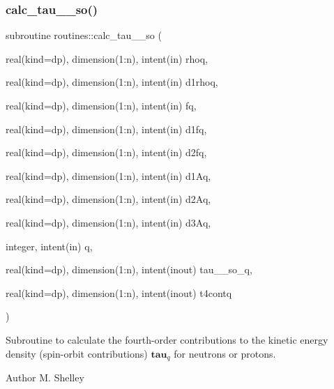 \subsubsection{\texorpdfstring{calc\+\_\+tau\+\_\+\_\+so()}{calc\_tau\_4\_so()}}
{\footnotesize\ttfamily subroutine routines\+::calc\+\_\+tau\+\_\+\_\+so (\begin{DoxyParamCaption}\item[{real(kind=dp), dimension(1\+:n), intent(in)}]{rhoq,  }\item[{real(kind=dp), dimension(1\+:n), intent(in)}]{d1rhoq,  }\item[{real(kind=dp), dimension(1\+:n), intent(in)}]{fq,  }\item[{real(kind=dp), dimension(1\+:n), intent(in)}]{d1fq,  }\item[{real(kind=dp), dimension(1\+:n), intent(in)}]{d2fq,  }\item[{real(kind=dp), dimension(1\+:n), intent(in)}]{d1\+Aq,  }\item[{real(kind=dp), dimension(1\+:n), intent(in)}]{d2\+Aq,  }\item[{real(kind=dp), dimension(1\+:n), intent(in)}]{d3\+Aq,  }\item[{integer, intent(in)}]{q,  }\item[{real(kind=dp), dimension(1\+:n), intent(inout)}]{tau\+\_\+\_\+so\+\_\+q,  }\item[{real(kind=dp), dimension(1\+:n), intent(inout)}]{t4contq }\end{DoxyParamCaption})}



Subroutine to calculate the fourth-\/order contributions to the kinetic energy density (spin-\/orbit contributions) $\textbf{tau}_q$ for neutrons or protons. 

\begin{DoxyAuthor}{Author}
M. Shelley 
\end{DoxyAuthor}

